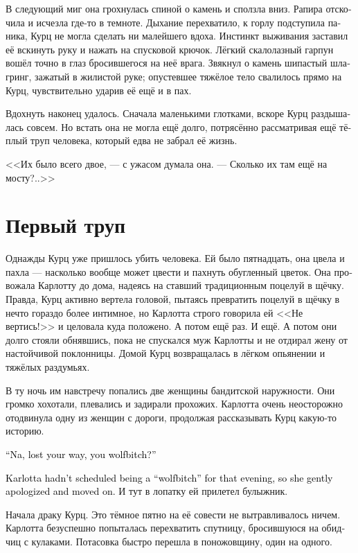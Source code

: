 \documentclass[a4paper,12pt,fleqn]{book}\usepackage{cooltooltips}\usepackage{polyglossia}\setdefaultlanguage[babelshorthands=true]{russian}\setotherlanguage{english}\defaultfontfeatures{Ligatures=TeX,Mapping=tex-text} \usepackage{xcolor}\definecolor{lightgray}{HTML}{bbbbbb}\color{lightgray}\newcommand{\ml}[3]{\textenglish{\textcolor{black}{#3}}}
\begin{document}
В следующий миг она грохнулась спиной о камень и сползла вниз.
Рапира отскочила и исчезла где-то в темноте.
Дыхание перехватило, к горлу подступила паника, Курц не могла сделать ни малейшего вдоха.
Инстинкт выживания заставил её вскинуть руку и нажать на спусковой крючок.
Лёгкий скалолазный гарпун вошёл точно в глаз бросившегося на неё врага.
Звякнул о камень шипастый шлагринг, зажатый в жилистой руке;
опустевшее тяжёлое тело свалилось прямо на Курц, чувствительно ударив её ещё и в пах.

Вдохнуть наконец удалось.
Сначала маленькими глотками, вскоре Курц раздышалась совсем.
Но встать она не могла ещё долго, потрясённо рассматривая ещё тёплый труп человека, который едва не забрал её жизнь.

<<Их было всего двое, --- с ужасом думала она.
--- Сколько их там ещё на мосту?..>>

\section{Первый труп}

Однажды Курц уже пришлось убить человека.
Ей было пятнадцать, она цвела и пахла --- насколько вообще может цвести и пахнуть обугленный цветок.
Она провожала Карлотту до дома, надеясь на ставший традиционным поцелуй в щёчку.
Правда, Курц активно вертела головой, пытаясь превратить поцелуй в щёчку в нечто гораздо более интимное, но Карлотта строго говорила ей <<Не вертись!>> и целовала куда положено.
А потом ещё раз.
И ещё.
А потом они долго стояли обнявшись, пока не спускался муж Карлотты и не отдирал жену от настойчивой поклонницы.
Домой Курц возвращалась в лёгком опьянении и тяжёлых раздумьях.

В ту ночь им навстречу попались две женщины бандитской наружности.
Они громко хохотали, плевались и задирали прохожих.
Карлотта очень неосторожно отодвинула одну из женщин с дороги, продолжая рассказывать Курц какую-то историю.

\ml{$0$}
{--- На, ты попутала, сука бирючья?}
{``Na, lost your way, you wolfbitch?''}

\ml{$0$}
{У Карлотты в планах на вечер не значилось становиться <<сукой бирючьей>>, поэтому она вежливо извинилась и пошла дальше.}
{Karlotta hadn't scheduled being a ``wolfbitch'' for that evening, so she gently apologized and moved on.}
И тут в лопатку ей прилетел булыжник.

Начала драку Курц.
Это тёмное пятно на её совести не вытравливалось ничем.
Карлотта безуспешно попыталась перехватить спутницу, бросившуюся на обидчиц с кулаками.
Потасовка быстро перешла в поножовщину, один на одного.
\end{document}
